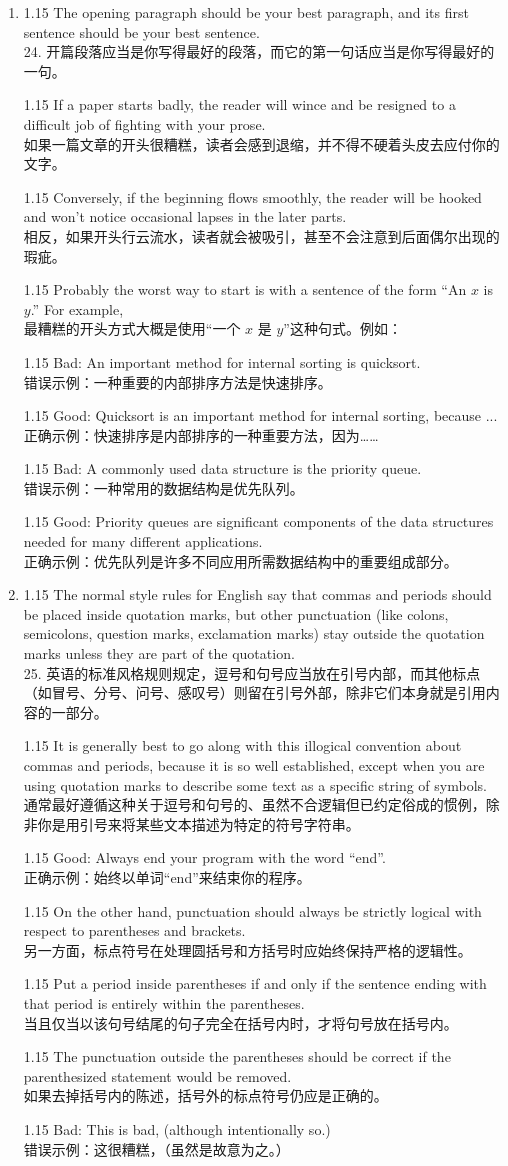 \documentclass[12pt,a4paper]{article}
\newcommand{\bilingual}[2]{
    \begin{spacing}{1.15} %
        \noindent \normalsize #1 \\[-0.5ex] %
        \small \textcolor{blue!70!black}{#2} %
    \end{spacing}
    \vspace{0.8em} %
}
\begin{document}
\begin{enumerate}
\item \bilingual{The opening paragraph should be your best paragraph, and its first sentence should be your best sentence.}{24. 开篇段落应当是你写得最好的段落，而它的第一句话应当是你写得最好的一句。} %
\bilingual{If a paper starts badly, the reader will wince and be resigned to a difficult job of fighting with your prose.}{如果一篇文章的开头很糟糕，读者会感到退缩，并不得不硬着头皮去应付你的文字。} %
\bilingual{Conversely, if the beginning flows smoothly, the reader will be hooked and won't notice occasional lapses in the later parts.}{相反，如果开头行云流水，读者就会被吸引，甚至不会注意到后面偶尔出现的瑕疵。} %
\bilingual{Probably the worst way to start is with a sentence of the form ``An $x$ is $y$.'' For example,}{最糟糕的开头方式大概是使用“一个 $x$ 是 $y$”这种句式。例如：} %
\bilingual{Bad: An important method for internal sorting is quicksort.}{错误示例：一种重要的内部排序方法是快速排序。} %
\bilingual{Good: Quicksort is an important method for internal sorting, because ...}{正确示例：快速排序是内部排序的一种重要方法，因为……} %
\bilingual{Bad: A commonly used data structure is the priority queue.}{错误示例：一种常用的数据结构是优先队列。} %
\bilingual{Good: Priority queues are significant components of the data structures needed for many different applications.}{正确示例：优先队列是许多不同应用所需数据结构中的重要组成部分。} %

\item \bilingual{The normal style rules for English say that commas and periods should be placed inside quotation marks, but other punctuation (like colons, semicolons, question marks, exclamation marks) stay outside the quotation marks unless they are part of the quotation.}{25. 英语的标准风格规则规定，逗号和句号应当放在引号内部，而其他标点（如冒号、分号、问号、感叹号）则留在引号外部，除非它们本身就是引用内容的一部分。} %
\bilingual{It is generally best to go along with this illogical convention about commas and periods, because it is so well established, except when you are using quotation marks to describe some text as a specific string of symbols.}{通常最好遵循这种关于逗号和句号的、虽然不合逻辑但已约定俗成的惯例，除非你是用引号来将某些文本描述为特定的符号字符串。} %
\bilingual{Good: Always end your program with the word ``end''.}{正确示例：始终以单词“end”来结束你的程序。} %
\bilingual{On the other hand, punctuation should always be strictly logical with respect to parentheses and brackets.}{另一方面，标点符号在处理圆括号和方括号时应始终保持严格的逻辑性。} %
\bilingual{Put a period inside parentheses if and only if the sentence ending with that period is entirely within the parentheses.}{当且仅当以该句号结尾的句子完全在括号内时，才将句号放在括号内。} %
\bilingual{The punctuation outside the parentheses should be correct if the parenthesized statement would be removed.}{如果去掉括号内的陈述，括号外的标点符号仍应是正确的。} %
\bilingual{Bad: This is bad, (although intentionally so.)}{错误示例：这很糟糕，（虽然是故意为之。）} %


\end{enumerate}
\end{document}
